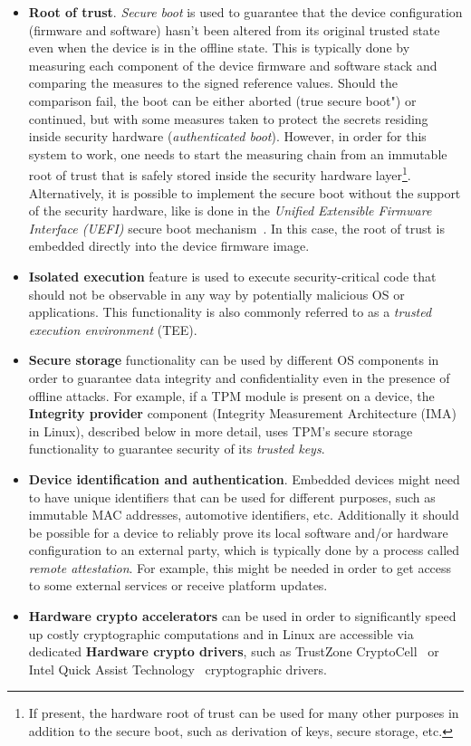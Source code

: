 \begin{itemize}
	\item \textbf{Root of trust}. \textit{Secure boot} is used to guarantee that the device configuration (firmware and software) hasn't been altered from its original trusted state even when the device is in the offline state. This is typically done by measuring each component of the device firmware and software stack and comparing the measures to the signed reference values. Should the comparison fail, the boot can be either aborted (true secure boot") or continued, but with some measures taken to protect the secrets residing inside security hardware (\textit{authenticated boot}). However, in order for this system to work, one needs to start the measuring chain from an immutable root of trust that is safely stored inside the security hardware layer\footnote{If present, the hardware root of trust can be used for many other purposes in addition to the secure boot, such as derivation of keys, secure storage, etc.}. Alternatively, it is possible to implement the secure boot without the support of the security hardware, like is done in the \textit{Unified Extensible Firmware Interface (UEFI)} secure boot mechanism~\cite{uefi}. In this case, the root of trust is embedded directly into the device firmware image.
	\item \textbf{Isolated execution} feature is used to execute security-critical code that should not be observable in any way by potentially malicious OS or applications. This functionality is also commonly referred to as a \textit{trusted execution environment} (TEE).
	\item \textbf{Secure storage} functionality can be used by different OS components in order to guarantee data integrity and confidentiality even in the presence of offline attacks. For example, if a TPM module is present on a device, the \textbf{Integrity provider} component (Integrity Measurement Architecture (IMA) in Linux), described below in more detail, uses TPM's secure storage functionality to guarantee security of its \textit{trusted keys}.
	\item \textbf{Device identification and authentication}. Embedded devices might need to have unique identifiers that can be used for different purposes, such as immutable MAC addresses, automotive identifiers, etc.  Additionally it should be possible for a device to reliably prove its local software and/or hardware configuration to an external party, which is typically done by a process called \textit{remote attestation}. For example, this might be needed in order to get access to some external services or receive platform updates.
	\item \textbf{Hardware crypto accelerators} can be used in order to significantly speed up costly cryptographic computations and in Linux are accessible via dedicated \textbf{Hardware crypto drivers}, such as TrustZone CryptoCell~\cite{cryptocell} or Intel Quick Assist Technology~\cite{intelQAT} cryptographic drivers.
\end{itemize}


